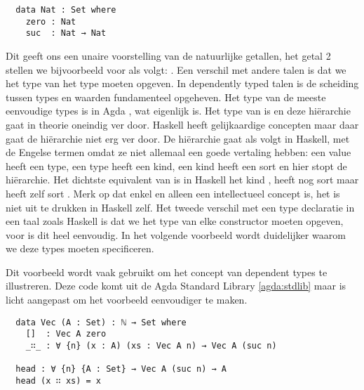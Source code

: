 \begin{verbatim}
  data Nat : Set where
    zero : Nat
    suc  : Nat → Nat
\end{verbatim}

Dit geeft ons een unaire voorstelling van de natuurlijke getallen, het getal 2
stellen we bijvoorbeeld voor als volgt: . Een verschil
met andere talen is dat we het type van het type moeten opgeven.  In
dependently typed talen is de scheiding tussen types en waarden fundamenteel
opgeheven. Het type van de meeste eenvoudige types is in Agda , wat
eigenlijk  is. Het type van  is  en deze
hiërarchie gaat in theorie oneindig ver door. Haskell heeft gelijkaardige
concepten maar daar gaat de hiërarchie niet erg ver door. De hiërarchie gaat
als volgt in Haskell, met de Engelse termen omdat ze niet allemaal een goede
vertaling hebben: een value heeft een type, een type heeft een kind, een kind
heeft een sort en hier stopt de hiërarchie. Het dichtste equivalent van
 is in Haskell het kind \ihask{*}, \ihask{*} heeft nog sort
 maar  heeft zelf sort . Merk op dat
 enkel en alleen een intellectueel concept is, het is niet uit te
drukken in Haskell zelf.  Het tweede verschil met een type declaratie in een
taal zoals Haskell is dat we het type van elke constructor moeten opgeven, voor
 is dit heel eenvoudig. In het volgende voorbeeld wordt duidelijker
waarom we deze types moeten specificeren.

Dit voorbeeld wordt vaak gebruikt om het concept van dependent types te
illustreren. Deze code komt uit de Agda Standard Library \ref{agda:stdlib} maar
is licht aangepast om het voorbeeld eenvoudiger te maken.

\begin{verbatim}
  data Vec (A : Set) : ℕ → Set where
    []  : Vec A zero
    _∷_ : ∀ {n} (x : A) (xs : Vec A n) → Vec A (suc n)

  head : ∀ {n} {A : Set} → Vec A (suc n) → A
  head (x ∷ xs) = x
\end{verbatim}

